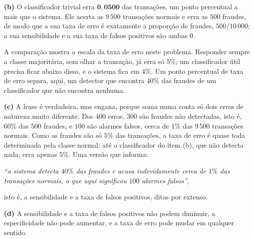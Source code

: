 \documentclass[11pt,a4paper]{article}
\begin{document}
\begin{solucao}
\smallskip
\textbf{(b)} O classificador trivial erra $\mathbf{0{,}0500}$ das transações, um ponto
percentual a mais que o sistema. Ele acerta as $9\,500$ transações normais e erra as
$500$ fraudes, de modo que a sua taxa de erro é exatamente a proporção de fraudes,
$500/10\,000$; a sua sensibilidade e a sua taxa de falsos positivos são ambas $0$.

A comparação mostra a escala da taxa de erro neste problema. Responder sempre a
classe majoritária, sem olhar a transação, já erra só $5\%$; um classificador útil
precisa ficar abaixo disso, e o sistema fica em $4\%$. Um ponto percentual de taxa de
erro separa, aqui, um detector que encontra $40\%$ das fraudes de um classificador
que não encontra nenhuma.

\smallskip
\textbf{(c)} A frase é verdadeira, mas engana, porque soma numa conta só dois erros
de natureza muito diferente. Dos $400$ erros, $300$ são fraudes não detectadas, isto
é, $60\%$ das $500$ fraudes, e $100$ são alarmes falsos, cerca de $1\%$ das $9\,500$
transações normais. Como as fraudes são só $5\%$ das transações, a taxa de erro é
quase toda determinada pela classe normal: até o classificador do item (b), que não
detecta nada, erra apenas $5\%$. Uma versão que informa:
\begin{center}
\emph{``o sistema detecta $40\%$ das fraudes e acusa indevidamente cerca de $1\%$ das
transações normais, o que aqui significou $100$ alarmes falsos''},
\end{center}
isto é, a sensibilidade e a taxa de falsos positivos, ditas por extenso.

\smallskip
\textbf{(d)} A sensibilidade e a taxa de falsos positivos não podem diminuir, a
especificidade não pode aumentar, e a taxa de erro pode mudar em qualquer sentido.


\end{solucao}
\end{document}
